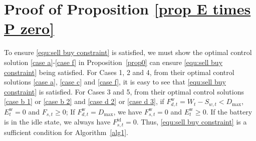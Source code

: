 \documentclass[journal]{IEEEtran}
\def\w{\textrm{w}}
\begin{document}
\section{Proof of Proposition \ref{prop E times P zero}}\label{app E times P zero}
\IEEEproof
To ensure \eqref{equ:sell buy constraint} is satisfied, we must show the optimal control solution \eqref{case a}-\eqref{case f} in Proposition~\ref{prop0} can ensure \eqref{equ:sell buy constraint} being satisfied.
For Cases 1, 2 and 4, from their optimal control solutions \eqref{case a}, \eqref{case c} and \eqref{case f}, it is easy to see that \eqref{equ:sell buy constraint} is satisfied.
For Cases 3 and 5, from their optimal control solutions \eqref{case b 1} or \eqref{case b 2} and \eqref{case d 2} or \eqref{case d 3}, if $F^\w_{d,t}=W_t-S_{w,t}<D_{\max}$,  $E^\w_t=0$ and $F_{s,t}\geq0$; If $F^\w_{d,t}=D_{\max}$, we have $F^\w_{s,t}=0$ and $E^\w_t\geq0$.
If the battery is in the idle state, we always have $F_{s,t}^\textrm{id}=0$. Thus, \eqref{equ:sell buy constraint} is a sufficient condition for Algorithm~\ref{alg1}.
\endIEEEproof
\end{document}
